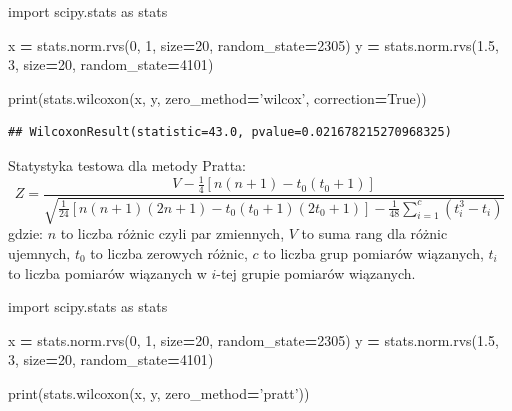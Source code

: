 \documentclass[polish,]{book}
\newenvironment{Shaded}{\begin{snugshade}}{\end{snugshade}}
\newcommand{\BuiltInTok}[1]{#1}
\newcommand{\DecValTok}[1]{\textcolor[rgb]{0.00,0.00,0.81}{#1}}
\newcommand{\FloatTok}[1]{\textcolor[rgb]{0.00,0.00,0.81}{#1}}
\newcommand{\ImportTok}[1]{#1}
\newcommand{\NormalTok}[1]{#1}
\newcommand{\OperatorTok}[1]{\textcolor[rgb]{0.81,0.36,0.00}{\textbf{#1}}}
\newcommand{\StringTok}[1]{\textcolor[rgb]{0.31,0.60,0.02}{#1}}
\newcommand{\VariableTok}[1]{\textcolor[rgb]{0.00,0.00,0.00}{#1}}
\begin{document}
\begin{Shaded}
\begin{Highlighting}[]
\ImportTok{import}\NormalTok{ scipy.stats }\ImportTok{as}\NormalTok{ stats}

\NormalTok{x }\OperatorTok{=}\NormalTok{ stats.norm.rvs(}\DecValTok{0}\NormalTok{, }\DecValTok{1}\NormalTok{, size}\OperatorTok{=}\DecValTok{20}\NormalTok{, random_state}\OperatorTok{=}\DecValTok{2305}\NormalTok{)}
\NormalTok{y }\OperatorTok{=}\NormalTok{ stats.norm.rvs(}\FloatTok{1.5}\NormalTok{, }\DecValTok{3}\NormalTok{, size}\OperatorTok{=}\DecValTok{20}\NormalTok{, random_state}\OperatorTok{=}\DecValTok{4101}\NormalTok{)}

\BuiltInTok{print}\NormalTok{(stats.wilcoxon(x, y, zero_method}\OperatorTok{=}\StringTok{'wilcox'}\NormalTok{, correction}\OperatorTok{=}\VariableTok{True}\NormalTok{))}
\end{Highlighting}
\end{Shaded}

\begin{verbatim}
## WilcoxonResult(statistic=43.0, pvalue=0.021678215270968325)
\end{verbatim}

Statystyka testowa dla metody Pratta:
\begin{equation}
Z=\frac{V-\frac{1}{4}\left[n(n+1)-t_0(t_0+1)\right]}{\sqrt{\frac{1}{24}\left[n(n+1)(2n+1)-t_0(t_0+1)(2t_0+1)\right]-\frac{1}{48}\sum_{i=1}^{c}(t_i^3-t_i)}}
\label{eq:dep06}
\end{equation}
gdzie: \(n\) to liczba różnic czyli par zmiennych, \(V\) to suma rang dla różnic ujemnych, \(t_0\) to liczba zerowych różnic, \(c\) to liczba grup pomiarów wiązanych, \(t_i\) to liczba pomiarów wiązanych w \(i\)-tej grupie pomiarów wiązanych.

\begin{Shaded}
\begin{Highlighting}[]
\ImportTok{import}\NormalTok{ scipy.stats }\ImportTok{as}\NormalTok{ stats}

\NormalTok{x }\OperatorTok{=}\NormalTok{ stats.norm.rvs(}\DecValTok{0}\NormalTok{, }\DecValTok{1}\NormalTok{, size}\OperatorTok{=}\DecValTok{20}\NormalTok{, random_state}\OperatorTok{=}\DecValTok{2305}\NormalTok{)}
\NormalTok{y }\OperatorTok{=}\NormalTok{ stats.norm.rvs(}\FloatTok{1.5}\NormalTok{, }\DecValTok{3}\NormalTok{, size}\OperatorTok{=}\DecValTok{20}\NormalTok{, random_state}\OperatorTok{=}\DecValTok{4101}\NormalTok{)}

\BuiltInTok{print}\NormalTok{(stats.wilcoxon(x, y, zero_method}\OperatorTok{=}\StringTok{'pratt'}\NormalTok{))}
\end{Highlighting}
\end{Shaded}
\end{document}
